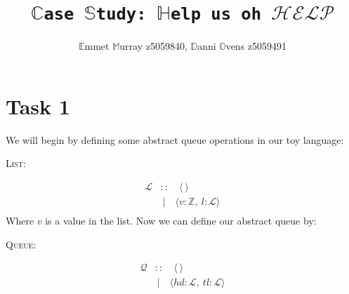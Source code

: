 \documentclass[a4paper]{scrartcl}
\title{\texttt{$\mathbb{C}$ase $\mathbb{S}$tudy: $\mathbb{H}$elp us oh $\mathcal{HELP}$}}
\author{$\mathbb{E}$mmet $\mathbb{M}$urray z5059840, $\mathbb{D}$anni $\mathbb{O}$vens z5059491}
\newcommand{\Z}{\mathbb{Z}}
\begin{document}
\maketitle
\section*{Task 1}
We will begin by defining some abstract queue operations in our toy language:\\
%
\begin{center}
{\LARGE{\textsc{List:}}\normalsize}
\end{center}
\begin{align*}
\mathcal{L} &:: \quad \langle ~ \rangle \\
&~| \quad \langle v : \Z,~l : \mathcal{L} \rangle \\
\end{align*}
%
Where $v$ is a value in the list. Now we can define our abstract queue by:\\
\begin{center}
{\LARGE{\textsc{Queue:}}\normalsize}
\end{center}
%
\begin{align*}
\mathcal{Q} &:: \quad \langle ~ \rangle \\
&~| \quad \langle hd : \mathcal{L},~tl : \mathcal{L} \rangle \\
\end{align*}
\end{document}
